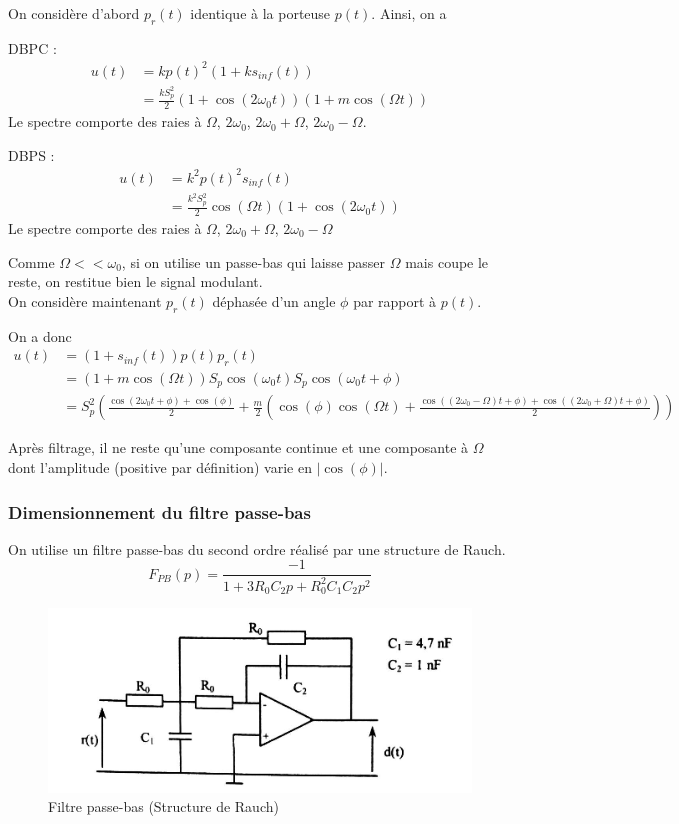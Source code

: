 \documentclass[../../Cours_M1.tex]{subfiles}
\begin{document}
On considère d'abord $p_r(t)$ identique à la porteuse $p(t)$.
Ainsi, on a 
\begin{multicols}{2}
DBPC :
\begin{align*}
u(t) & = kp(t)^2(1+ks_{inf}(t)) \\
& = \frac{kS_p^2}{2}(1+\cos(2\omega_0 t))(1+m\cos(\Omega t)) 
\end{align*}
Le spectre comporte des raies à $\Omega$, $2\omega_0$, $2\omega_0+\Omega$, $2\omega_0-\Omega$.

DBPS :
\begin{align*}
u(t) & = k^2p(t)^2s_{inf}(t)\\
& = \frac{k^2S_p^2}{2}\cos(\Omega t)(1+\cos(2\omega_0 t))
\end{align*}
Le spectre comporte des raies à $\Omega$, $2\omega_0+\Omega$, $2\omega_0-\Omega$
\end{multicols}

Comme $\Omega << \omega_0$, si on utilise un passe-bas qui laisse passer $\Omega$ mais coupe le reste, on restitue bien le signal modulant.\\


On considère maintenant $p_r(t)$ déphasée d'un angle $\phi$ par rapport à $p(t)$.

On a donc 
\begin{align*}
u(t) & = (1+s_{inf}(t))p(t)p_r(t) \\
& = (1+m\cos(\Omega t))S_p\cos(\omega_0 t)S_p\cos(\omega_0 t + \phi) \\
& = S_p^2(\frac{\cos(2\omega_0 t + \phi) + \cos(\phi)}{2}+\frac{m}{2}(\cos(\phi)\cos(\Omega t) + \frac{\cos((2\omega_0-\Omega)t+\phi) + \cos((2\omega_0+\Omega)t+\phi)}{2}))
\end{align*}

Après filtrage, il ne reste qu'une composante continue et une composante à $\Omega$ dont l'amplitude (positive par définition) varie en $|\cos(\phi)|$.

\subsubsection{Dimensionnement du filtre passe-bas}
On utilise un filtre passe-bas du second ordre réalisé par une structure de Rauch.
\[F_{PB}(p)=\frac{-1}{1+3R_0C_2p+R_0^2C_1C_2p^2}\]

\begin{figure}[h!]
\centering
\includegraphics[scale=0.5]{PB.png}
\caption{Filtre passe-bas (Structure de Rauch)}
\end{figure}
\end{document}
